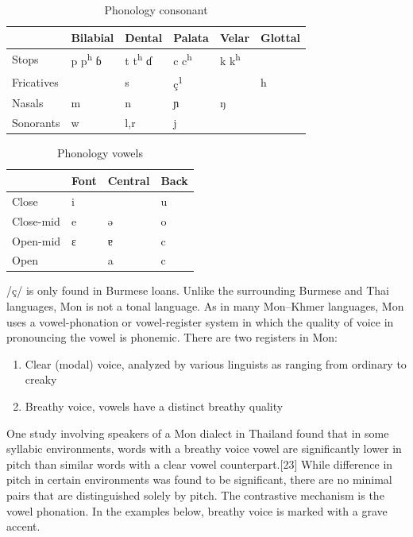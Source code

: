 \documentclass[conference]{IEEEtran}
\begin{document}
\begin{table}
\begin{center}
\caption{\label{Mon Phonology Consonant} Phonology consonant }
\normalsize %
\begin{tabular}{ |m{1.5cm}|m{1cm}|m{1cm}|m{1cm}|m{1cm}|m{1cm}| }
\hline
 & Bilabial & Dental & Palata & Velar & Glottal \\
\hline
Stops & p p\textsuperscript{h} ɓ & t t\textsuperscript{h} ɗ & c c\textsuperscript{h} & k k\textsuperscript{h} & \textipa{\: ?} \\
\hline
Fricatives &  & s & ç\textsuperscript{1} &  & h \\
\hline
Nasals & m & n & ɲ & ŋ &  \\
\hline
Sonorants & w & l,r & j &  &  \\
\hline

\end{tabular}
\end{center}
\end{table}

\begin{table}
\begin{center}
\caption{\label{Mon Phonology Vowels} Phonology vowels }
\normalsize %
\begin{tabular}{ |m{2cm}|m{1.2cm}|m{1.3cm}|m{1cm}| }
\hline
 & Font & Central & Back \\
\hline
Close & i &  & u \\
\hline
Close-mid & e & ə & o \\
\hline
Open-mid & ɛ & ɐ & c  \\
\hline
Open &  & a & c \\
\hline

\end{tabular}
\end{center}
\end{table}
/ç/ is only found in Burmese loans. Unlike the surrounding Burmese and Thai languages, Mon is not a tonal language. As in many Mon–Khmer languages, Mon uses a vowel-phonation or vowel-register system in which the quality of voice in pronouncing the vowel is phonemic. There are two registers in Mon:

\begin{enumerate}
  \item Clear (modal) voice, analyzed by various linguists as ranging from ordinary to creaky
  \item Breathy voice, vowels have a distinct breathy quality
\end{enumerate}
One study involving speakers of a Mon dialect in Thailand found that in some syllabic environments, words with a breathy voice vowel are significantly lower in pitch than similar words with a clear vowel counterpart.[23] While difference in pitch in certain environments was found to be significant, there are no minimal pairs that are distinguished solely by pitch. The contrastive mechanism is the vowel phonation. In the examples below, breathy voice is marked with a grave accent.\cite{b8}
\end{document}
